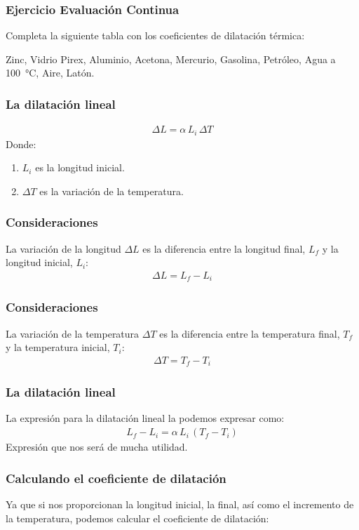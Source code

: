\documentclass[14pt]{beamer}
\begin{document}
\begin{frame}
\frametitle{Ejercicio Evaluación Continua}
Completa la siguiente tabla con los coeficientes de dilatación térmica:
\pause

Zinc, Vidrio Pirex, Aluminio, Acetona, Mercurio, Gasolina, Petróleo, Agua a \SI{100}{\degreeCelsius}, Aire, Latón.
\end{frame}
\begin{frame}
\frametitle{La dilatación lineal}
\vspace*{-1cm}
\begin{align*}
\Delta L = \alpha \, L_{i} \, \Delta T
\end{align*}
Donde:
\begin{enumerate}[<+->]
\conti
\item $L_{i}$ es la longitud inicial.
\item $\Delta T$ es la variación de la temperatura.
\end{enumerate}
\end{frame}
\begin{frame}
\frametitle{Consideraciones}
La variación de la longitud $\Delta L$ es la diferencia entre la longitud final, $L_{f}$ y la longitud inicial, $L_{i}$:
\pause
\begin{align*}
\Delta L = L_{f} - L_{i}
\end{align*}
\end{frame}
\begin{frame}
\frametitle{Consideraciones}
La variación de la temperatura $\Delta T$ es la diferencia entre la temperatura final, $T_{f}$ y la temperatura inicial, $T_{i}$:
\pause
\begin{align*}
\Delta T = T_{f} - T_{i}
\end{align*}
\end{frame}
\begin{frame}
\frametitle{La dilatación lineal}
La expresión para la dilatación lineal la podemos expresar como:
\pause
\begin{align*}
L_{f} - L_{i} = \alpha \, L_{i} \, \left( T_{f} - T_{i} \right)
\end{align*}
Expresión que nos será de mucha utilidad.
\end{frame}
\begin{frame}
\frametitle{Calculando el coeficiente de dilatación}
Ya que si nos proporcionan la longitud inicial, la final, así como el incremento de la temperatura, podemos calcular el coeficiente de dilatación:
\end{frame}
\end{document}
